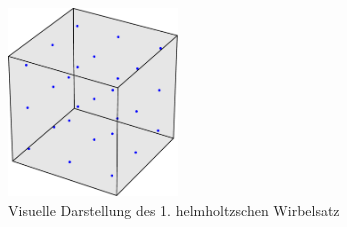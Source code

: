 \begin{figure}
\centering
\includegraphics[width=0.4\textwidth]{papers/wirbelringe/fig/cube_still_particles.pdf}
\caption{Visuelle Darstellung des 1. helmholtzschen Wirbelsatz \label{buch:papers:Wirbelringe:fig:Helmholtz_1}}
\end{figure}